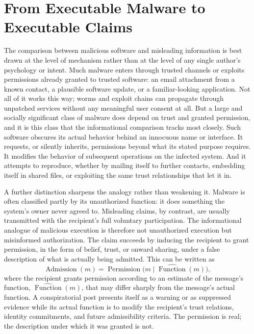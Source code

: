 \documentclass[11pt]{article}
\begin{document}
\section{From Executable Malware to Executable Claims}

The comparison between malicious software and misleading information is best drawn at the level of mechanism rather than at the level of any single author's psychology or intent. Much malware enters through trusted channels or exploits permissions already granted to trusted software: an email attachment from a known contact, a plausible software update, or a familiar-looking application. Not all of it works this way; worms and exploit chains can propagate through unpatched services without any meaningful user consent at all. But a large and socially significant class of malware does depend on trust and granted permission, and it is this class that the informational comparison tracks most closely. Such software obscures its actual behavior behind an innocuous name or interface. It requests, or silently inherits, permissions beyond what its stated purpose requires. It modifies the behavior of subsequent operations on the infected system. And it attempts to reproduce, whether by mailing itself to further contacts, embedding itself in shared files, or exploiting the same trust relationships that let it in.

A further distinction sharpens the analogy rather than weakening it. Malware is often classified partly by its unauthorized function: it does something the system's owner never agreed to. Misleading claims, by contrast, are usually transmitted with the recipient's full voluntary participation. The informational analogue of malicious execution is therefore not unauthorized execution but misinformed authorization. The claim succeeds by inducing the recipient to grant permission, in the form of belief, trust, or onward sharing, under a false description of what is actually being admitted. This can be written as
\[
\operatorname{Admission}(m) = \operatorname{Permission}\bigl(m \mid \widehat{\operatorname{Function}}(m)\bigr),
\]
where the recipient grants permission according to an estimate of the message's function, \(\widehat{\operatorname{Function}}(m)\), that may differ sharply from the message's actual function. A conspiratorial post presents itself as a warning or as suppressed evidence while its actual function is to modify the recipient's trust relations, identity commitments, and future admissibility criteria. The permission is real; the description under which it was granted is not.
\end{document}
